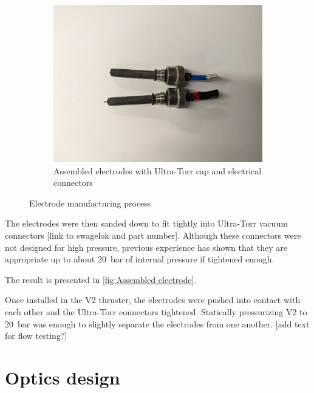 \begin{figure}[!ht]
                \hfill
                \begin{subfigure}[t]{0.30\textwidth}
                    \centering
                    \includegraphics[width=\textwidth]{assets/3 design/V2 electrodes.jpg}
                    \caption{Assembled electrodes with Ultra-Torr cap and electrical connectors}
                    \label{fig:Assembled electrode}
                \end{subfigure}

                \caption{Electrode manufacturing process}
            \end{figure}

            The electrodes were then sanded down to fit tightly into Ultra-Torr vacuum connectors [link to swagelok and part number]. Although these connectors were not designed for high pressure, previous experience has shown that they are appropriate up to about \qty{20}{bar} of internal pressure if tightened enough.

            The result is presented in \autoref{fig:Assembled electrode}.

            Once installed in the V2 thruster, the electrodes were pushed into contact with each other and the Ultra-Torr connectors tightened. Statically pressurizing V2 to \qty{20}{bar} was enough to slightly separate the electrodes from one another. [add text for flow testing?]

            \section{Optics design}
                
